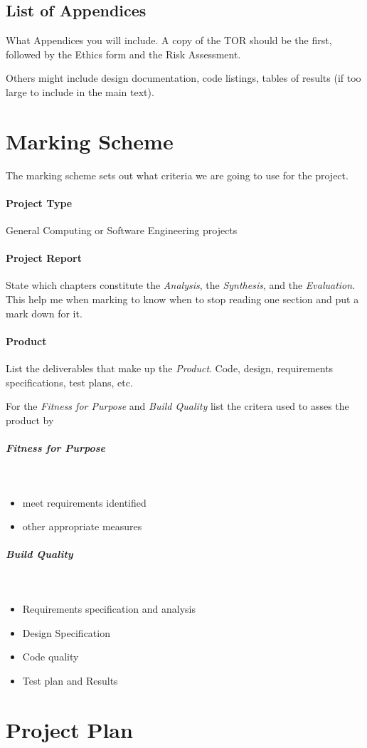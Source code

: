 \subsection{List of Appendices}
What Appendices you will include.  A copy of the TOR should be the first, followed by the Ethics form and the Risk Assessment.

Others might include design documentation, code listings, tables of results (if too large to include in the main text).

\section{Marking Scheme}
The marking scheme sets out what criteria we are going to use for the project.

\paragraph{Project Type} General Computing or Software Engineering projects

\paragraph{Project Report}  State which chapters constitute the \emph{Analysis}, the \emph{Synthesis}, and the \emph{Evaluation}.  This help me when marking to know when to stop reading one section and put a mark down for it.

\paragraph{Product}  List the deliverables that make up the \emph{Product}.  Code, design, requirements specifications, test plans, etc.

For the \emph{Fitness for Purpose} and \emph{Build Quality}  list the critera used to asses the product by

\subparagraph{Fitness for Purpose}~
\begin{itemize}
	\item meet requirements identified
	\item other appropriate measures
\end{itemize}

\subparagraph{Build Quality}~
\begin{itemize}
	\item Requirements specification and analysis
	\item Design Specification
	\item Code quality
	\item Test plan and Results
\end{itemize}

\clearpage

\section{Project Plan}
\noindent
{}
